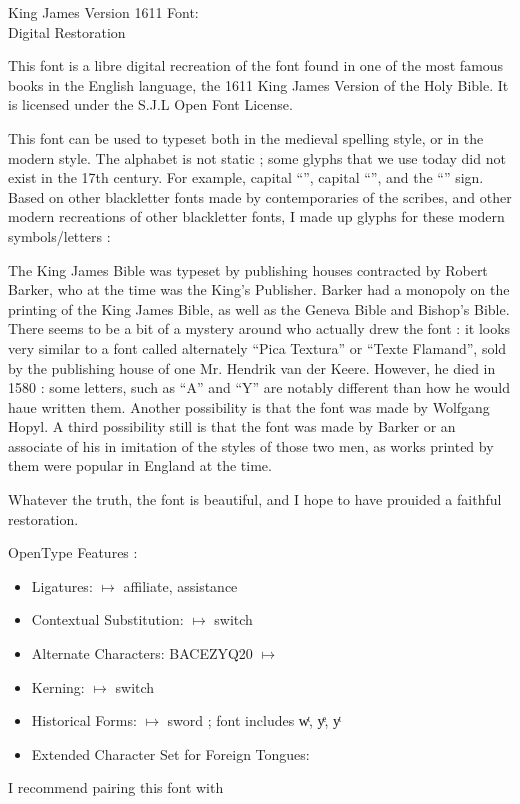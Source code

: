 \documentclass[border=15pt]{standalone}
\begin{document}
\begin{minipage}{4in}
\setlength{\parindent}{10pt}
\setlength{\parskip}{3ex plus 0.5ex minus 0.2ex}
    \begin{center}
{\huge{King James Version 1611 Font:\\Digital Restoration}}
    \end{center}

This font is a libre digital recreation of the font found in one of the most famous books in the English language, the 1611 King James Version of the Holy Bible. It is licensed under the S.J.L Open Font License.

This font can be used to typeset both in the medieval spelling style, or in the modern style. The alphabet is not static ; some glyphs that we use today did not exist in the 17th century. For example, capital “{}”, capital “{}”, and the “{}” sign. Based on other blackletter fonts made by contemporaries of the scribes, and other modern recreations of other blackletter fonts, I made up glyphs for these modern symbols/letters : {}

The King James Bible was typeset by publishing houses contracted by Robert Barker, who at the time was the King’s Publisher. Barker had a monopoly on the printing of the King James Bible, as well as the Geneva Bible and Bishop’s Bible. There seems to be a bit of a mystery around who actually drew the font : it looks very similar to a font called alternately “Pica Textura” or “Texte Flamand”, sold by the publishing house of one Mr. Hendrik van der Keere. However, he died in 1580 : some letters, such as “A” and “Y” are notably different than how he would haue written them. Another possibility is that the font was made by Wolfgang Hopyl. A third possibility still is that the font was made by Barker or an associate of his in imitation of the styles of those two men, as works printed by them were popular in England at the time.

Whatever the truth, the font is beautiful, and I hope to have prouided a faithful restoration.

OpenType Features :
    \begin{itemize}
        \item Ligatures: {} $\mapsto$ a{\color{BrickRed}ffi}liate, a{\color{BrickRed}ssi}stance
\item Contextual Substitution: {} $\mapsto$ switch
\item Alternate Characters: BACEZYQ20 $\mapsto$ {}
\item Kerning: {} $\mapsto$ switch
\item Historical Forms: {} $\mapsto$ sword ; font includes wͭ, yͤ, yͭ
\item Extended Character Set for Foreign Tongues: {\color{BrickRed}}
    \end{itemize}
    I recommend pairing this font with {}
\end{minipage}
\end{document}
